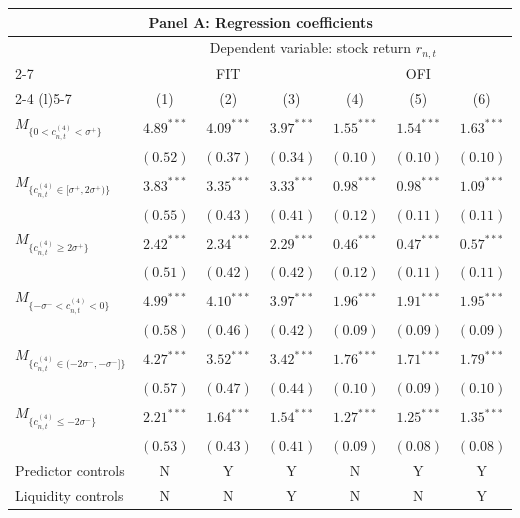 \begin{tabular}{lcccccc}
  \hline \multicolumn{7}{c}{Panel A: Regression coefficients} \\
 \hline
                                    & \multicolumn{6}{c}{Dependent variable: stock return $r_{n,t}$} \\

                                    \cmidrule(l){2-7} & \multicolumn{3}{c}{FIT} & \multicolumn{3}{c}{OFI} \\
 \cmidrule(l){2-4} \cmidrule(l){5-7} 
  & (1) & (2) & (3) & (4) & (5) & (6) \\ 
  $M_{\{0 < c^{(4)}_{n,t} < \sigma^+\}}$ & $4.89^{***}$ & $4.09^{***}$ & $3.97^{***}$ & $1.55^{***}$ & $1.54^{***}$ & $1.63^{***}$ \\
   & $(0.52)$ & $(0.37)$ & $(0.34)$ & $(0.10)$ & $(0.10)$ & $(0.10)$ \\
  $M_{\{c^{(4)}_{n,t} \in [\sigma^+, 2\sigma^+)\}}$ & $3.83^{***}$ & $3.35^{***}$ & $3.33^{***}$ & $0.98^{***}$ & $0.98^{***}$ & $1.09^{***}$ \\
   & $(0.55)$ & $(0.43)$ & $(0.41)$ & $(0.12)$ & $(0.11)$ & $(0.11)$ \\
  $M_{\{c^{(4)}_{n,t} \ge 2\sigma^+\}}$ & $2.42^{***}$ & $2.34^{***}$ & $2.29^{***}$ & $0.46^{***}$ & $0.47^{***}$ & $0.57^{***}$ \\
   & $(0.51)$ & $(0.42)$ & $(0.42)$ & $(0.12)$ & $(0.11)$ & $(0.11)$ \\
  $M_{\{-\sigma^- < c^{(4)}_{n,t} < 0\}}$ & $4.99^{***}$ & $4.10^{***}$ & $3.97^{***}$ & $1.96^{***}$ & $1.91^{***}$ & $1.95^{***}$ \\
   & $(0.58)$ & $(0.46)$ & $(0.42)$ & $(0.09)$ & $(0.09)$ & $(0.09)$ \\
  $M_{\{c^{(4)}_{n,t} \in (-2\sigma^-, -\sigma^-]\}}$ & $4.27^{***}$ & $3.52^{***}$ & $3.42^{***}$ & $1.76^{***}$ & $1.71^{***}$ & $1.79^{***}$ \\
   & $(0.57)$ & $(0.47)$ & $(0.44)$ & $(0.10)$ & $(0.09)$ & $(0.10)$ \\
  $M_{\{c^{(4)}_{n,t} \le -2\sigma^-\}}$ & $2.21^{***}$ & $1.64^{***}$ & $1.54^{***}$ & $1.27^{***}$ & $1.25^{***}$ & $1.35^{***}$ \\
  \vspace{5pt}  & $(0.53)$ & $(0.43)$ & $(0.41)$ & $(0.09)$ & $(0.08)$ & $(0.08)$ \\
  Predictor controls & N & Y & Y & N & Y & Y \\
  \vspace{5pt}Liquidity controls & N & N & Y & N & N & Y \\

\end{tabular}

